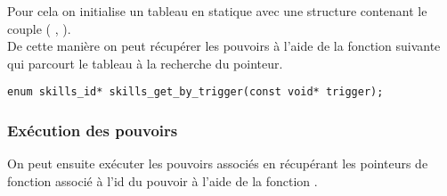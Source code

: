 Pour cela on initialise un tableau en statique avec une structure contenant le couple ( , ). \\
De cette manière on peut récupérer les pouvoirs à l'aide de la fonction suivante qui parcourt le tableau à la recherche du pointeur. 

\begin{lstlisting}[frame=single, caption={Récupération des pouvoirs}]
enum skills_id* skills_get_by_trigger(const void* trigger);
\end{lstlisting}

\subsubsection*{Exécution des pouvoirs}

On peut ensuite exécuter les pouvoirs associés en récupérant les pointeurs de fonction associé à l'id du pouvoir à l'aide de la fonction .
